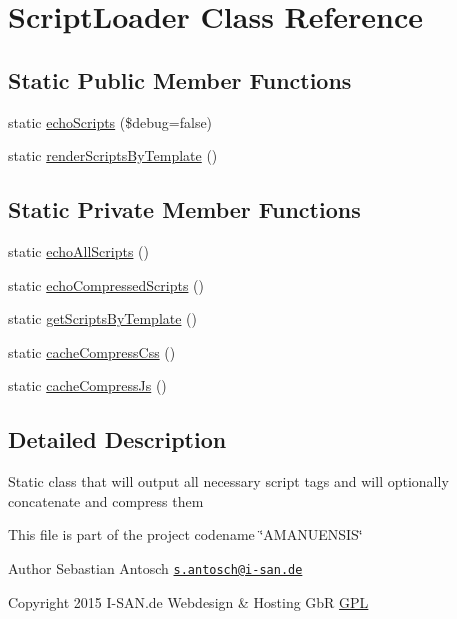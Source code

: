 \hypertarget{class_script_loader}{}\section{Script\+Loader Class Reference}
\label{class_script_loader}
\subsection*{Static Public Member Functions}
\begin{DoxyCompactItemize}
\item 
static \hyperlink{class_script_loader_a3aed3a72d76aeefc626520b27462cfb4}{echo\+Scripts} (\$debug=false)
\item 
static \hyperlink{class_script_loader_ae759fccd01c6627e968ca947f1d3a037}{render\+Scripts\+By\+Template} ()
\end{DoxyCompactItemize}
\subsection*{Static Private Member Functions}
\begin{DoxyCompactItemize}
\item 
static \hyperlink{class_script_loader_afdb87513ad9f9ad117d8c06345e1a2c7}{echo\+All\+Scripts} ()
\item 
static \hyperlink{class_script_loader_aa4d04b95f0b376d3be9e1605454b860d}{echo\+Compressed\+Scripts} ()
\item 
static \hyperlink{class_script_loader_a667fa00ce97f004a58b32961fb4e3dc8}{get\+Scripts\+By\+Template} ()
\item 
static \hyperlink{class_script_loader_ad73fc55052f4970fd58bcf3ab422b2b9}{cache\+Compress\+Css} ()
\item 
static \hyperlink{class_script_loader_a3f95d89ee15eea49ebced0d77e3fd8c2}{cache\+Compress\+Js} ()
\end{DoxyCompactItemize}


\subsection{Detailed Description}
Static class that will output all necessary script tags and will optionally concatenate and compress them

This file is part of the project codename \char`\"{}\+A\+M\+A\+N\+U\+E\+N\+S\+I\+S\char`\"{}

\begin{DoxyAuthor}{Author}
Sebastian Antosch \href{mailto:s.antosch@i-san.de}{\tt s.\+antosch@i-\/san.\+de} 
\end{DoxyAuthor}
\begin{DoxyCopyright}{Copyright}
2015 I-\/\+S\+A\+N.\+de Webdesign \& Hosting Gb\+R \hyperlink{}{G\+P\+L }
\end{DoxyCopyright}


